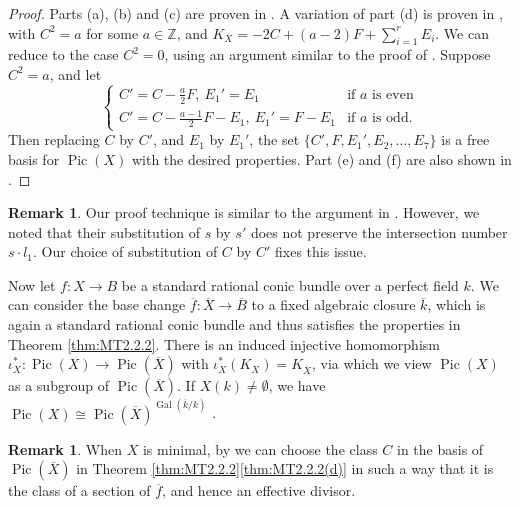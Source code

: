 \documentclass[a4paper, 11pt, reqno]{amsart}
\numberwithin{equation}{section} \numberwithin{figure}{section}
\DeclareMathOperator{\Pic}{Pic}
\DeclareMathOperator{\Gal}{Gal}
\def \Z {{\mathbb Z}}
\newcommand{\ra}{\rightarrow}
\theoremstyle{definition}
\newtheorem{remark}[lemma]{Remark}
\numberwithin{lemma}{section}
\begin{document}
\begin{proof}
    Parts (a), (b) and (c) are proven in \cite[Theorem 3]{iskovskih}. A variation of part (d) is proven in \cite[Proposition 0.4(a)]{KunyavskiiTsfasman}, with $C^2 = a$ for some $a \in \Z$, and $K_X = -2C + (a-2)F + \sum_{i=1}^r E_i$. We can reduce to the case $C^2 = 0$, using an argument similar to the proof of \cite[Lemma 2.10]{KST}. Suppose $C^2 = a$, and let \[ \begin{cases}
        C' = C - \frac{a}{2}F, \ E_1' = E_1 &\text{if $a$ is even}\\
        C'= C - \frac{a-1}{2}F - E_1, \ E_1' = F - E_1 &\text{if $a$ is odd.}
    \end{cases}\]
    Then replacing $C$ by $C'$, and $E_1$ by $E_1'$, the set $\{C', F, E_1', E_2, \ldots, E_7\}$ is a free basis for $\Pic(X)$ with the desired properties. Part (e) and (f) are also shown in \cite[Proposition 0.4]{KunyavskiiTsfasman}.
\end{proof}

\begin{remark}
    Our proof technique is similar to the argument in \cite[Lemma 2.10]{KST}. However, we noted that their substitution of $s$ by $s'$ does not preserve the intersection number $s \cdot l_1$. Our choice of substitution of $C$ by $C'$ fixes this issue.
\end{remark}

Now let $f \colon X \ra B$ be a standard rational conic bundle over a perfect field $k$. We can consider the base change $\overline{f} \colon \overline{X} \ra \overline {B}$ to a fixed algebraic closure $\overline{k}$, which is again a standard rational conic bundle and thus satisfies the properties in Theorem \ref{thm:MT2.2.2}. There is an induced injective homomorphism $\iota_X^* \colon \Pic(X) \ra \Pic(\overline{X})$ with $\iota_X^*(K_X) = K_{\overline{X}}$, via which we view $\Pic(X)$ as a subgroup of $\Pic(\overline{X})$. If $X(k) \neq \emptyset$, we have $\Pic(X) \cong \Pic(\overline{X})^{\Gal(\overline{k}/k)}$ \cite[Theorem 4.2.5]{BLT}.

\begin{remark}\label{rem:sectionC}
    When $X$ is minimal, by \cite[Proposition 2.6, Corollary 2.7]{trepalindeg2} we can choose the class $C$ in the basis of $\Pic(\overline{X})$ in Theorem \ref{thm:MT2.2.2}\ref{thm:MT2.2.2(d)} in such a way that it is the class of a section of $\overline{f}$, and hence an effective divisor.
\end{remark}
\end{document}
